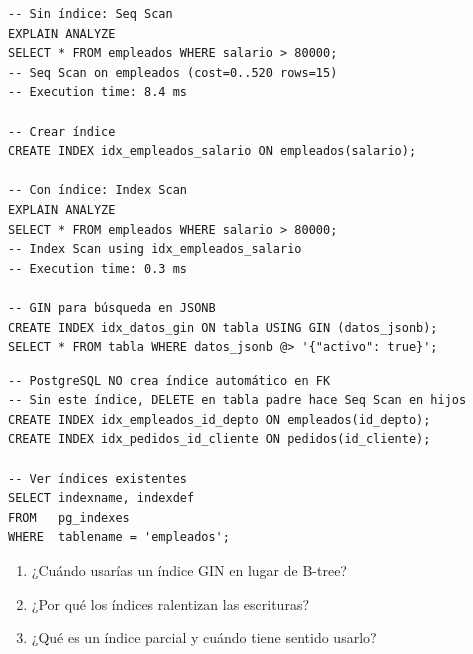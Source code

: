 \begin{lstlisting}[caption={EXPLAIN ANALYZE --- verificar uso de índice}]
-- Sin índice: Seq Scan
EXPLAIN ANALYZE
SELECT * FROM empleados WHERE salario > 80000;
-- Seq Scan on empleados (cost=0..520 rows=15)
-- Execution time: 8.4 ms

-- Crear índice
CREATE INDEX idx_empleados_salario ON empleados(salario);

-- Con índice: Index Scan
EXPLAIN ANALYZE
SELECT * FROM empleados WHERE salario > 80000;
-- Index Scan using idx_empleados_salario
-- Execution time: 0.3 ms

-- GIN para búsqueda en JSONB
CREATE INDEX idx_datos_gin ON tabla USING GIN (datos_jsonb);
SELECT * FROM tabla WHERE datos_jsonb @> '{"activo": true}';
\end{lstlisting}

\begin{lstlisting}[caption={Índices y FK en PostgreSQL}]
-- PostgreSQL NO crea índice automático en FK
-- Sin este índice, DELETE en tabla padre hace Seq Scan en hijos
CREATE INDEX idx_empleados_id_depto ON empleados(id_depto);
CREATE INDEX idx_pedidos_id_cliente ON pedidos(id_cliente);

-- Ver índices existentes
SELECT indexname, indexdef
FROM   pg_indexes
WHERE  tablename = 'empleados';
\end{lstlisting}

\begin{entrevistabox}
\begin{enumerate}
  \item ¿Cuándo usarías un índice GIN en lugar de B-tree?
  \item ¿Por qué los índices ralentizan las escrituras?
  \item ¿Qué es un índice parcial y cuándo tiene sentido usarlo?
\end{enumerate}
\end{entrevistabox}
